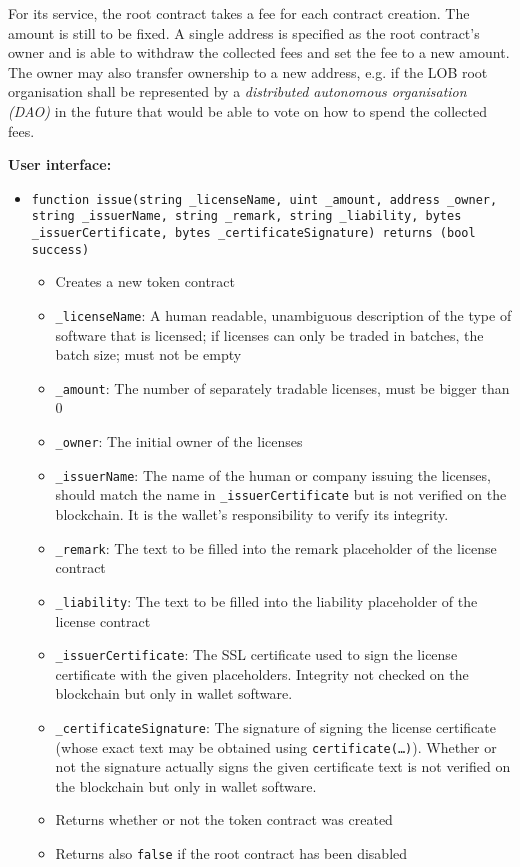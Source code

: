 \documentclass[a4paper]{article}
\begin{document}
For its service, the root contract takes a fee for each contract creation. The amount is still to be fixed. 
A single address is specified as the root contract's owner and is able to withdraw the collected fees and set the fee to a new amount. The owner may also transfer ownership to a new address, e.g. if the LOB root organisation shall be represented by a \emph{distributed autonomous organisation (DAO)} in the future that would be able to vote on how to spend the collected fees.

\textbf{User interface:}

\begin{itemize}
  \item \texttt{function issue(string \_licenseName, uint \_amount, address \_owner, string \_issuerName, string \_remark, string \_liability, bytes \_issuerCertificate, bytes \_certificateSignature) returns (bool success)}
  \begin{itemize}
    \item Creates a new token contract
    \item \texttt{\_licenseName}: A human readable, unambiguous description of the type of software that is licensed; if licenses can only be traded in batches, the batch size; must not be empty
    \item \texttt{\_amount}: The number of separately tradable licenses, must be bigger than 0
    \item \texttt{\_owner}: The initial owner of the licenses
    \item \texttt{\_issuerName}: The name of the human or company issuing the licenses, should match the name in \texttt{\_issuerCertificate} but is not verified on the blockchain. It is the wallet's responsibility to verify its integrity.
    \item \texttt{\_remark}: The text to be filled into the remark placeholder of the license contract
    \item \texttt{\_liability}: The text to be filled into the liability placeholder of the license contract
    \item \texttt{\_issuerCertificate}: The SSL certificate used to sign the license certificate with the given placeholders. Integrity not checked on the blockchain but only in wallet software.
    \item \texttt{\_certificateSignature}: The signature of signing the license certificate (whose exact text may be obtained using \texttt{certificate(…)}). Whether or not the signature actually signs the given certificate text is not verified on the blockchain but only in wallet software.
    \item Returns whether or not the token contract was created
    \item Returns also \texttt{false} if the root contract has been disabled
  \end{itemize}
  

\end{itemize}
\end{document}

